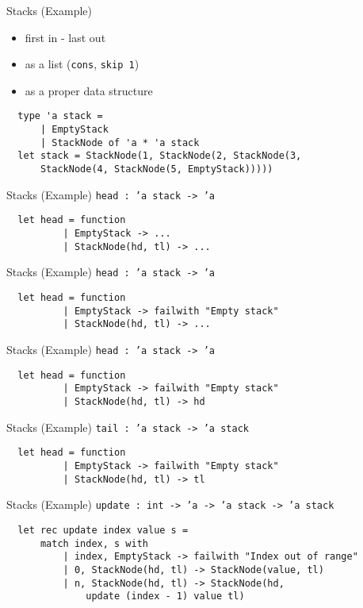 \documentclass{beamer}
\begin{document}
\begin{frame}[fragile]{Stacks (Example)}
  \begin{itemize}[<+->]
    \item first in - last out
    \item as a list (\texttt{cons}, \texttt{skip 1})
    \item as a proper data structure
  \end{itemize}
  \pause
  \begin{verbatim}
  type 'a stack =
      | EmptyStack
      | StackNode of 'a * 'a stack
  let stack = StackNode(1, StackNode(2, StackNode(3, 
      StackNode(4, StackNode(5, EmptyStack)))))
  \end{verbatim}
\end{frame}

\begin{frame}[fragile]{Stacks (Example)}
  \texttt{head : 'a stack -> 'a}
  \pause
  \begin{verbatim}
  let head = function
          | EmptyStack -> ...
          | StackNode(hd, tl) -> ...
  \end{verbatim}
\end{frame}

\begin{frame}[fragile]{Stacks (Example)}
  \texttt{head : 'a stack -> 'a}
  \begin{verbatim}
  let head = function
          | EmptyStack -> failwith "Empty stack"
          | StackNode(hd, tl) -> ...
  \end{verbatim}
\end{frame}

\begin{frame}[fragile]{Stacks (Example)}
  \texttt{head : 'a stack -> 'a}
  \begin{verbatim}
  let head = function
          | EmptyStack -> failwith "Empty stack"
          | StackNode(hd, tl) -> hd
  \end{verbatim}
\end{frame}

\begin{frame}[fragile]{Stacks (Example)}
  \texttt{tail : 'a stack -> 'a stack}
  \pause
  \begin{verbatim}
  let head = function
          | EmptyStack -> failwith "Empty stack"
          | StackNode(hd, tl) -> tl
  \end{verbatim}
\end{frame}

\begin{frame}[fragile]{Stacks (Example)}
  \texttt{update : int -> 'a -> 'a stack -> 'a stack}
  \pause
  \small
  \begin{verbatim}
  let rec update index value s =
      match index, s with
          | index, EmptyStack -> failwith "Index out of range"
          | 0, StackNode(hd, tl) -> StackNode(value, tl)
          | n, StackNode(hd, tl) -> StackNode(hd, 
              update (index - 1) value tl)
  \end{verbatim}
\end{frame}
\end{document}
